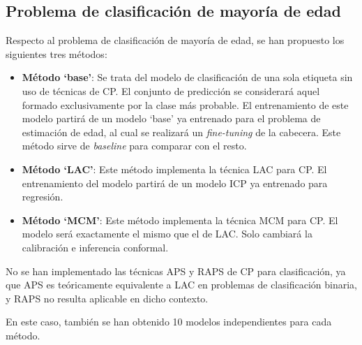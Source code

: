 \FloatBarrier


\subsection{Problema de clasificación de mayoría de edad}

Respecto al problema de clasificación de mayoría de edad, se han propuesto los siguientes tres métodos: 

\begin{itemize}

    \item \textbf{Método `base'}: Se trata del modelo de clasificación de una sola etiqueta sin uso de técnicas de \acrshort{CP}. El conjunto de predicción se considerará aquel formado exclusivamente por la clase más probable. El entrenamiento de este modelo partirá de un modelo `base' ya entrenado para el problema de estimación de edad, al cual se realizará un \textit{fine-tuning} de la cabecera. Este método sirve de \textit{baseline} para comparar con el resto. 

    \item \textbf{Método `LAC'}: Este método implementa la técnica \acrshort{LAC} para \acrshort{CP}. El entrenamiento del modelo partirá de un modelo \acrshort{ICP} ya entrenado para regresión.

    \item \textbf{Método `MCM'}: Este método implementa la técnica MCM para CP. El modelo será exactamente el mismo que el de \acrshort{LAC}. Solo cambiará la calibración e inferencia conformal. 

\end{itemize} 

No se han implementado las técnicas \acrshort{APS} y \acrshort{RAPS} de CP para clasificación, ya que \acrshort{APS} es teóricamente equivalente a \acrshort{LAC} en problemas de clasificación binaria, y \acrshort{RAPS} no resulta aplicable en dicho contexto.

En este caso, también se han obtenido 10 modelos independientes para cada método. 

